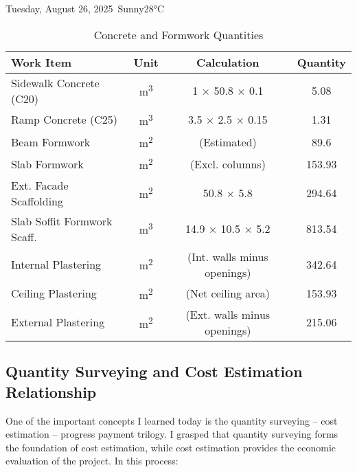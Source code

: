 \begin{dailyentry}{Tuesday, August 26, 2025}{\weathersunny\ Sunny}{28°C}
\begin{table}[ht]
\centering
\caption{Concrete and Formwork Quantities}
\begin{tabular}{@{}p{5.5cm}ccc@{}}
\toprule
\textbf{Work Item} & \textbf{Unit} & \textbf{Calculation} & \textbf{Quantity} \\
\midrule
Sidewalk Concrete (C20) & m\textsuperscript{3} & 1 $\times$ 50.8 $\times$ 0.1 & 5.08 \\
Ramp Concrete (C25) & m\textsuperscript{3} & 3.5 $\times$ 2.5 $\times$ 0.15 & 1.31 \\
\midrule
Beam Formwork & m\textsuperscript{2} & (Estimated) & 89.6 \\
Slab Formwork & m\textsuperscript{2} & (Excl. columns) & 153.93 \\
Ext. Facade Scaffolding & m\textsuperscript{2} & 50.8 $\times$ 5.8 & 294.64 \\
Slab Soffit Formwork Scaff. & m\textsuperscript{3} & 14.9 $\times$ 10.5 $\times$ 5.2 & 813.54 \\
\midrule
Internal Plastering & m\textsuperscript{2} & (Int. walls minus openings) & 342.64 \\
Ceiling Plastering & m\textsuperscript{2} & (Net ceiling area) & 153.93 \\
External Plastering & m\textsuperscript{2} & (Ext. walls minus openings) & 215.06 \\
\bottomrule
\end{tabular}
\end{table}

\vspace{1cm}

\subsection*{Quantity Surveying and Cost Estimation Relationship}

One of the important concepts I learned today is the quantity surveying -- cost estimation -- progress payment trilogy. I grasped that quantity surveying forms the foundation of cost estimation, while cost estimation provides the economic evaluation of the project. In this process:

\begin{center}
\end{center}
\end{dailyentry}
